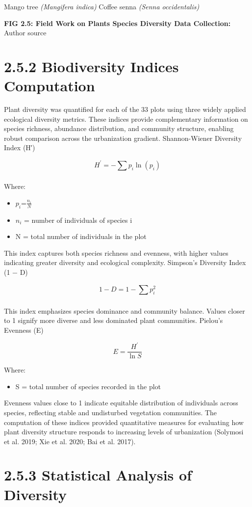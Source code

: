 Mango tree \emph{(Mangifera indica)} Coffee senna \emph{(Senna occidentalis)}


\textbf{FIG 2.5: Field Work on Plants Species Diversity Data Collection:} Author source

\hypertarget{biodiversity-indices-computation}{%
\section{\texorpdfstring{\textbf{2.5.2 Biodiversity Indices Computation}}{2.5.2 Biodiversity Indices Computation}}\label{biodiversity-indices-computation}}

Plant diversity was quantified for each of the 33 plots using three widely applied ecological diversity metrics. These indices provide complementary information on species richness, abundance distribution, and community structure, enabling robust comparison across the urbanization gradient.
Shannon-Wiener Diversity Index (H′)

\[H^{'} = - \sum_{}^{}{p_{i}\ln\left( p_{i} \right)}\]

Where:
\begin{itemize}
\item
  \(p_{i}\)=\(\frac{n_{i}}{N}\)
\item
  \(n_{i}\) = number of individuals of species i
\item
  N = total number of individuals in the plot
\end{itemize}

This index captures both species richness and evenness, with higher values indicating greater diversity and ecological complexity.
Simpson's Diversity Index (1 − D)

\[1 - D = 1 - \sum_{}^{}p_{i}^{2}\]

This index emphasizes species dominance and community balance. Values closer to 1 signify more diverse and less dominated plant communities.
Pielou's Evenness (E)

\[E = \frac{H^{'}}{\ln S}\]

Where:
\begin{itemize}
\item
  S = total number of species recorded in the plot
\end{itemize}

Evenness values close to 1 indicate equitable distribution of individuals across species, reflecting stable and undisturbed vegetation communities.
The computation of these indices provided quantitative measures for evaluating how plant diversity structure responds to increasing levels of urbanization (Solymosi et al. 2019; Xie et al. 2020; Bai et al. 2017).
\hypertarget{statistical-analysis-of-diversity}{%
\section{\texorpdfstring{\textbf{2.5.3 Statistical Analysis of Diversity}}{2.5.3 Statistical Analysis of Diversity}}\label{statistical-analysis-of-diversity}}

